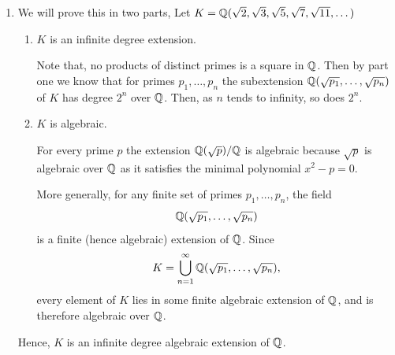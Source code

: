 \documentclass[12pt]{article}
\begin{document}
\begin{solution}
\begin{enumerate}
        \textbf{Inductive Step:} Adjoining $n$ square roots to $F$.

        By our claim, we know that $a_n$ is not a square in $ F(\sqrt{a_1},\dotsc,\sqrt{a_{n-1}})$. That is the following polynomial, 
        \[x^2 - a_n = 0\]
        is irreducible, and hence, minimal. 

        Since the minimal polynomial for $\sqrt{a_n}$ is a quadratic, the following is a degree $2$ extension, 
        
        \[[F(\sqrt{a_1},\dotsc,\sqrt{a_{n}}): F(\sqrt{a_1},\dotsc,\sqrt{a_{n-1}})] = 2\]

        Now, by the tower law we know that if 
        \[[F(\sqrt{a_1},\dotsc,\sqrt{a_{n}}): F(\sqrt{a_1},\dotsc,\sqrt{a_{n-1}})] = 2,\]
        and 
        \[[F(\sqrt{a_1},\dotsc,\sqrt{a_{n-1}}):F] = 2^{n-1}\] then, 
        \[[F(\sqrt{a_1},\dotsc,\sqrt{a_{n}}): F] = 2^n\]

    Hence proved. 

        \item We will prove this in two parts, 
        Let $K = \mathbb Q(\sqrt{2}, \sqrt{3}, \sqrt{5}, \sqrt{7}, \sqrt{11}, \dotsc)$
        \begin{enumerate}
            \item $K$ is an infinite degree extension. 
            
            Note that, no products of distinct primes is a square in $\mathbb Q$. Then by part one we know that for primes $p_1, \ldots, p_n$ the subextension $\mathbb Q(\sqrt{p_1}, \ldots, \sqrt{p_n})$ of $K$ has degree $2^n$ over $\mathbb Q$. Then, as $n$ tends to infinity, so does $2^n$.  

            \item $K$ is algebraic. 
            
            For every prime $p$ the extension $\mathbb Q(\sqrt{p})/\mathbb Q$ is algebraic because $\sqrt{p}$ is algebraic over $\mathbb Q$ as it satisfies the minimal polynomial $x^2 - p =0$. 

            More generally, for any finite set of primes $p_1,\dots,p_n$, the field
            \[\mathbb Q(\sqrt{p_1},\dots,\sqrt{p_n})\]
            is a finite (hence algebraic) extension of $\mathbb Q$. Since
            \[K = \bigcup_{n=1}^{\infty} \mathbb Q(\sqrt{p_1},\dots,\sqrt{p_n}),\]
            every element of $K$ lies in some finite algebraic extension of $\mathbb Q$, and is therefore algebraic over $\mathbb Q$.
        \end{enumerate}
        Hence, $K$ is an infinite degree algebraic extension of $\mathbb Q$. 
    \end{enumerate}
\end{solution}
\end{document}
